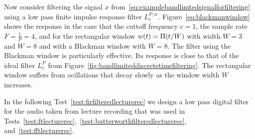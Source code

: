 Now consider filtering the signal $x$ from~\eqref{eq:examplebandlimtedsignalforfiltering} using a low pass finite impulse response filter $L_c^{P,w}$.  Figure~\ref{eq:blackmanwindow} shows  the response in the case that the cuttoff frequency $c = 1$, the sample rate $F = \tfrac{1}{P} = 4$, and for the rectangular window $w(t) = \Pi(t/W)$ with width $W = 3$ and $W = 8$ and with a Blackman window with $W = 8$.  The filter using the Blackman window is particularly effective.  Its response is close to that of the ideal filter $L_c^P$ from Figure~\ref{fig:bandlimiteddiscretetimefiltering}.  The rectangular window suffers from ocillations that decay slowly as the window width $W$ increases. 

In the following Test~\ref{test:firfilteredlecturerec} we design a low pass digital filter for the audio taken from lecture recording that was used in Tests~\ref{test:ftlecturerec},~\ref{test:butterworthfilteredlecturerec}, and~\ref{test:fftlecturerec}.

